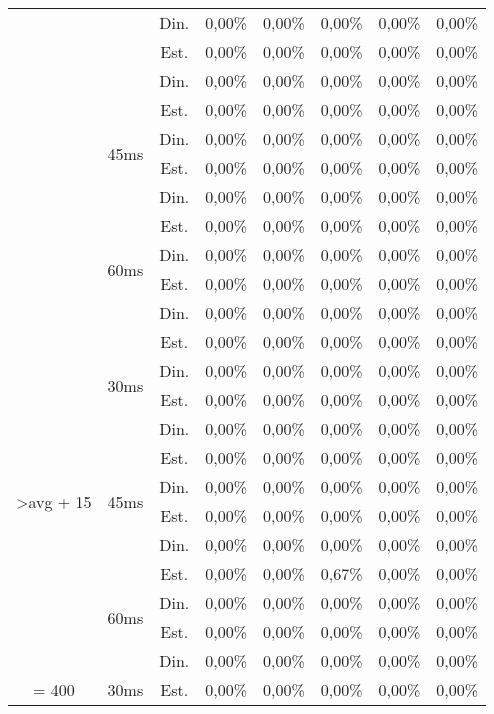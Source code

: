 \begin{center}
\begin{longtable}{|c|c|c|ccccc|}
 &  & Din. & 0,00\% & 0,00\% & 0,00\% & 0,00\% & 0,00\% \\
 &  & Est. & 0,00\% & 0,00\% & 0,00\% & 0,00\% & 0,00\% \\
 &  & Din. & 0,00\% & 0,00\% & 0,00\% & 0,00\% & 0,00\% \\ \cline{2-8} 
 & \multirow{4}{*}{45ms} & Est. & 0,00\% & 0,00\% & 0,00\% & 0,00\% & 0,00\% \\
 &  & Din. & 0,00\% & 0,00\% & 0,00\% & 0,00\% & 0,00\% \\
 &  & Est. & 0,00\% & 0,00\% & 0,00\% & 0,00\% & 0,00\% \\
 &  & Din. & 0,00\% & 0,00\% & 0,00\% & 0,00\% & 0,00\% \\ \cline{2-8} 
 & \multirow{4}{*}{60ms} & Est. & 0,00\% & 0,00\% & 0,00\% & 0,00\% & 0,00\% \\
 &  & Din. & 0,00\% & 0,00\% & 0,00\% & 0,00\% & 0,00\% \\
 &  & Est. & 0,00\% & 0,00\% & 0,00\% & 0,00\% & 0,00\% \\
 &  & Din. & 0,00\% & 0,00\% & 0,00\% & 0,00\% & 0,00\% \\ \hline
\multirow{12}{*}{\textgreater avg + 15} & \multirow{4}{*}{30ms} & Est. & 0,00\% & 0,00\% & 0,00\% & 0,00\% & 0,00\% \\
 &  & Din. & 0,00\% & 0,00\% & 0,00\% & 0,00\% & 0,00\% \\
 &  & Est. & 0,00\% & 0,00\% & 0,00\% & 0,00\% & 0,00\% \\
 &  & Din. & 0,00\% & 0,00\% & 0,00\% & 0,00\% & 0,00\% \\ \cline{2-8} 
 & \multirow{4}{*}{45ms} & Est. & 0,00\% & 0,00\% & 0,00\% & 0,00\% & 0,00\% \\
 &  & Din. & 0,00\% & 0,00\% & 0,00\% & 0,00\% & 0,00\% \\
 &  & Est. & 0,00\% & 0,00\% & 0,00\% & 0,00\% & 0,00\% \\
 &  & Din. & 0,00\% & 0,00\% & 0,00\% & 0,00\% & 0,00\% \\ \cline{2-8} 
 & \multirow{4}{*}{60ms} & Est. & 0,00\% & 0,00\% & 0,67\% & 0,00\% & 0,00\% \\
 &  & Din. & 0,00\% & 0,00\% & 0,00\% & 0,00\% & 0,00\% \\
 &  & Est. & 0,00\% & 0,00\% & 0,00\% & 0,00\% & 0,00\% \\
 &  & Din. & 0,00\% & 0,00\% & 0,00\% & 0,00\% & 0,00\% \\ \hline
\multirow{12}{*}{= 400} & \multirow{4}{*}{30ms} & Est. & 0,00\% & 0,00\% & 0,00\% & 0,00\% & 0,00\% \\

\end{longtable}
\end{center}
